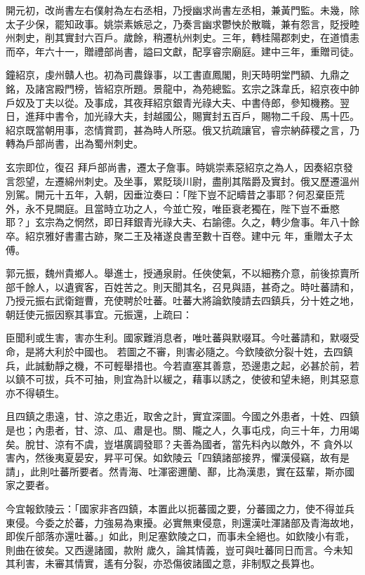 \begin{pinyinscope}
 開元初，改尚書左右僕射為左右丞相，乃授幽求尚書左丞相，兼黃門監。未幾，除太子少保，罷知政事。姚崇素嫉忌之，乃奏言幽求鬱怏於散職，兼有怨言，貶授睦州刺史，削其實封六百戶。歲餘，稍遷杭州刺史。三年，轉桂陽郡刺史，在道憤恚而卒，年六十一，贈禮部尚書，謚曰文獻，配享睿宗廟庭。建中三年，重贈司徒。



 鐘紹京，虔州贛人也。初為司農錄事，以工書直鳳閣，則天時明堂門額、九鼎之銘，及諸宮殿門榜，皆紹京所題。景龍中，為苑總監。玄宗之誅韋氏，紹京夜中帥戶奴及丁夫以從。及事成，其夜拜紹京銀青光祿大夫、中書侍郎，參知機務。翌日，進拜中書令，加光祿大夫，封越國公，賜實封五百戶，賜物二千段、馬十匹。紹京既當朝用事，恣情賞罰，甚為時人所惡。俄又抗疏讓官，睿宗納薛稷之言，乃轉為戶部尚書，出為蜀州刺史。



 玄宗即位，復召
 拜戶部尚書，遷太子詹事。時姚崇素惡紹京之為人，因奏紹京發言怨望，左遷綿州刺史。及坐事，累貶琰川尉，盡削其階爵及實封。俄又歷遷溫州別駕。開元十五年，入朝，因垂泣奏曰：「陛下豈不記疇昔之事耶？何忍棄臣荒外，永不見闕庭。且當時立功之人，今並亡歿，唯臣衰老獨在，陛下豈不垂愍耶？」玄宗為之惘然，即日拜銀青光祿大夫、右諭德。久之，轉少詹事。年八十餘卒。紹京雅好書畫古跡，聚二王及褚遂良書至數十百卷。建中元
 年，重贈太子太傅。



 郭元振，魏州貴鄉人。舉進士，授通泉尉。任俠使氣，不以細務介意，前後掠賣所部千餘人，以遺賓客，百姓苦之。則天聞其名，召見與語，甚奇之。時吐蕃請和，乃授元振右武衛鎧曹，充使聘於吐蕃。吐蕃大將論欽陵請去四鎮兵，分十姓之地，朝廷使元振因察其事宜。元振還，上疏曰：



 臣聞利或生害，害亦生利。國家難消息者，唯吐蕃與默啜耳。今吐蕃請和，默啜受命，是將大利於中國也。
 若圖之不審，則害必隨之。今欽陵欲分裂十姓，去四鎮兵，此誠動靜之機，不可輕舉措也。今若直塞其善意，恐邊患之起，必甚於前，若以鎮不可拔，兵不可抽，則宜為計以緩之，藉事以誘之，使彼和望未絕，則其惡意亦不得頓生。



 且四鎮之患遠，甘、涼之患近，取舍之計，實宜深圖。今國之外患者，十姓、四鎮是也；內患者，甘、涼、瓜、肅是也。關、隴之人，久事屯戍，向三十年，力用竭矣。脫甘、涼有不虞，豈堪廣調發耶？夫善為國者，當先料內以敵外，不
 貪外以害內，然後夷夏晏安，昇平可保。如欽陵云「四鎮諸部接界，懼漢侵竊，故有是請」，此則吐蕃所要者。然青海、吐渾密邇蘭、鄯，比為漢患，實在茲輩，斯亦國家之要者。



 今宜報欽陵云：「國家非吝四鎮，本置此以扼蕃國之要，分蕃國之力，使不得並兵東侵。今委之於蕃，力強易為東擾。必實無東侵意，則還漢吐渾諸部及青海故地，即俟斤部落亦還吐蕃。」如此，則足塞欽陵之口，而事未全絕也。如欽陵小有乖，則曲在彼矣。又西邊諸國，款附
 歲久，論其情義，豈可與吐蕃同日而言。今未知其利害，未審其情實，遙有分裂，亦恐傷彼諸國之意，非制馭之長算也。




\end{pinyinscope}
